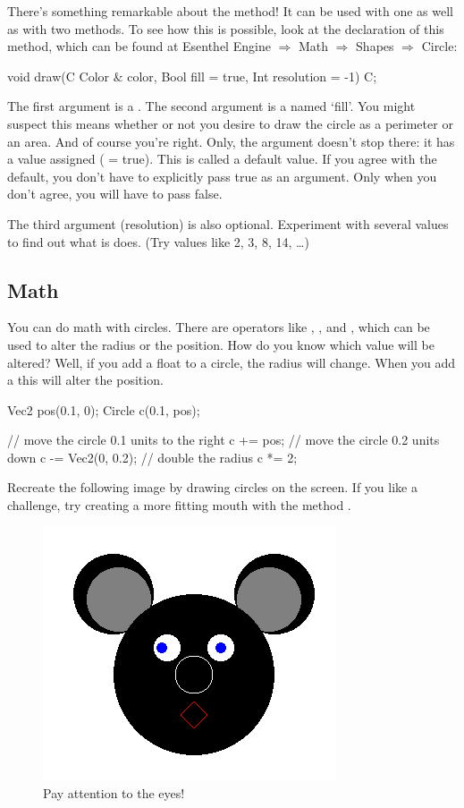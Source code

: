 There's something remarkable about the  method! It can be used with one as well as with two methods. To see how this is possible, look at the declaration of this method, which can be found at Esenthel Engine $\Rightarrow$ Math $\Rightarrow$ Shapes $\Rightarrow$ Circle:

\begin{code}
void draw(C Color & color, Bool fill = true, Int resolution = -1) C;
\end{code}

The first argument is a . The second argument is a  named `fill'. You might suspect this means whether or not you desire to draw the circle as a perimeter or an area. And of course you're right. Only, the argument doesn't stop there: it has a value assigned ( = true). This is called a default value. If you agree with the default, you don't have to explicitly pass true as an argument. Only when you don't agree, you will have to pass false.

\begin{note}
The third argument (resolution) is also optional. Experiment with several values to find out what is does. (Try values like 2, 3, 8, 14, \ldots)
\end{note}

\subsection{Math}
You can do math with circles. There are operators like \eeOpp{+=}, \eeOpp{-=}, \eeOpp{/=} and \eeOpp{*=}, which can be used to alter the radius or the position. How do you know which value will be altered? Well, if you add a float to a circle, the radius will change. When you add a  this will alter the position.

\begin{code}
Vec2 pos(0.1, 0);
Circle c(0.1, pos);

// move the circle 0.1 units to the right
c += pos;
// move the circle 0.2 units down
c -= Vec2(0, 0.2);
// double the radius
c *= 2;
\end{code}

\begin{exercise}
Recreate the following image by drawing circles on the screen. If you like a challenge, try creating a more fitting mouth with the method .

\begin{figure}[h]
\centering
\includegraphics[width=0.4\linewidth]{images/circle_exercise.png}
\caption[]{Pay attention to the eyes!}
\label{fig:pos2D}
\end{figure}

\end{exercise}

